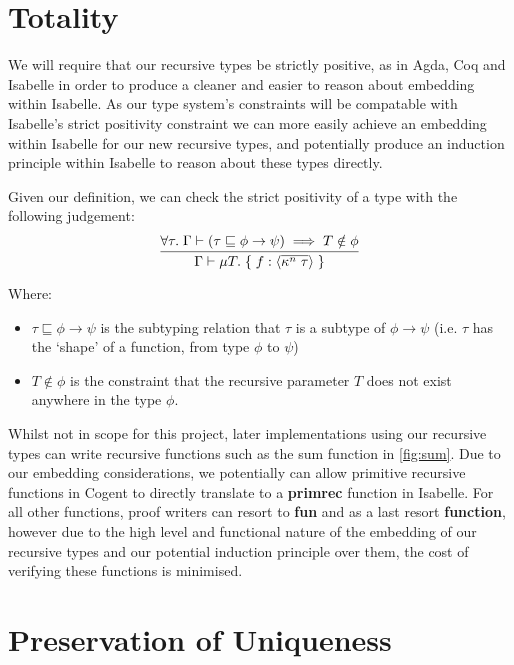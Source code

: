 \FloatBarrier

\section{Totality}

We will require that our recursive types be strictly positive, as in Agda,
Coq and Isabelle in order to produce a cleaner and easier to reason about
embedding within Isabelle. As our type system's constraints will be compatable with Isabelle's
strict positivity constraint we can more easily achieve an embedding within Isabelle for our new
recursive types, and potentially produce an induction principle within Isabelle to reason
about these types directly.

Given our definition, we can check the strict positivity of a type with the following judgement:
$$
\infer{
    \Gamma \vdash \mu T.\; \{\; f: \langle \overline{\kappa^n\; \tau} \rangle\; \}
}{
   \forall \tau.\; \Gamma \vdash (\tau \sqsubseteq \phi \rightarrow \psi) \implies T \notin \phi
}
$$

Where:
\begin{itemize}
    \item 
        $\tau \sqsubseteq \phi \rightarrow \psi$ is the subtyping relation that $\tau$ 
        is a subtype of $\phi \rightarrow \psi$ 
        (i.e. $\tau$ has the `shape' of a function, from type $\phi$ to $\psi$) 
    \item
        $T \notin \phi$ is the constraint that the recursive parameter $T$ 
        does not exist anywhere in the type $\phi$.
\end{itemize}

Whilst not in scope for this project, later implementations using our recursive types can
write recursive functions such as the sum function in \autoref{fig:sum}. Due to our embedding
considerations, we potentially can allow primitive recursive functions in Cogent to 
directly translate to a \textbf{primrec} function in Isabelle. For all other functions,
proof writers can resort to \textbf{fun} and as a last resort \textbf{function}, however
due to the high level and functional nature of the embedding of our recursive types
and our potential induction principle over them, the cost of verifying these functions
is minimised.

\section{Preservation of Uniqueness}

